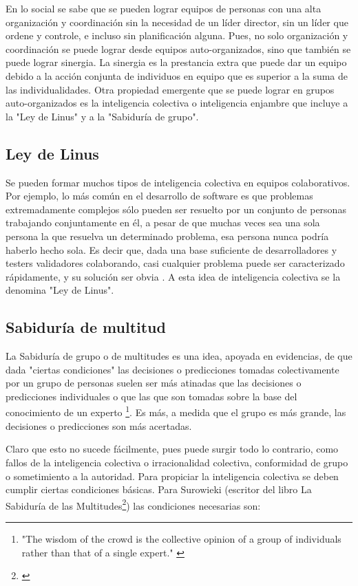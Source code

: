 En lo social se sabe que se pueden lograr equipos de personas con una alta organización y coordinación sin la necesidad de un líder director, sin un líder que ordene y controle, e incluso sin planificación alguna. Pues, no solo organización y coordinación se puede lograr desde equipos auto-organizados, sino que también se puede lograr sinergia. La sinergia es la prestancia extra que puede dar un equipo debido a la acción conjunta de individuos en equipo que es superior a la suma de las individualidades. Otra propiedad emergente que se puede lograr en grupos auto-organizados es la inteligencia colectiva o inteligencia enjambre que incluye a la "Ley de Linus" y a la "Sabiduría de grupo".

\subsection{Ley de Linus}

Se pueden formar muchos tipos de inteligencia colectiva en equipos colaborativos. Por ejemplo, lo más común en el desarrollo de software es que problemas extremadamente complejos sólo pueden ser resuelto por un conjunto de personas trabajando conjuntamente en él, a pesar de que muchas veces sea una sola persona la que resuelva un determinado problema, esa persona nunca podría haberlo hecho sola. Es decir que, dada una base suficiente de desarrolladores y testers validadores colaborando, casi cualquier problema puede ser caracterizado rápidamente, y su solución ser obvia \cite{Eric-Raymond-1997}. A esta idea de inteligencia colectiva se la denomina "Ley de Linus".

\subsection{Sabiduría de multitud}

La Sabiduría de grupo o de multitudes es una idea, apoyada en evidencias, de que dada "ciertas condiciones" las decisiones o predicciones tomadas colectivamente por un grupo de personas suelen ser más atinadas que las decisiones o predicciones individuales o que las que son tomadas sobre la base del conocimiento de un experto \cite{James-Surowiecki-2005}\footnote{"The wisdom of the crowd is the collective opinion of a group of individuals rather than that of a single expert." \cite{MIT-Press-2009}}. Es más, a medida que el grupo es más grande, las decisiones o predicciones son más acertadas.

Claro que esto no sucede fácilmente, pues puede surgir todo lo contrario, como fallos de la inteligencia colectiva o irracionalidad colectiva, conformidad de grupo o sometimiento a la autoridad. Para propiciar la inteligencia colectiva se deben cumplir ciertas condiciones básicas. Para Surowieki (escritor del libro La Sabiduría de las Multitudes\footnote{\cite{James-Surowiecki-2005}}) las condiciones necesarias son:

